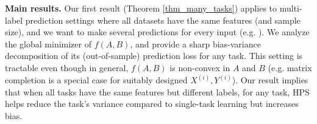 \medskip
\noindent\textbf{Main results.}
Our first result (Theorem \ref{thm_many_tasks}) applies to multi-label prediction settings where all datasets have the same features (and sample size), and we want to make several predictions for every input (e.g. \citet{hsu2009multi}).
We analyze the global minimizer of $f(A, B)$, and provide a sharp bias-variance decomposition of its (out-of-sample) prediction loss for any task.
This setting is tractable even though in general, $f(A, B)$ is non-convex in $A$ and $B$ (e.g. matrix completion is a special case for suitably designed $X^{(i)}, Y^{(i)}$).
Our result implies that when all tasks have the same features but different labels, for any task, HPS helps reduce the task's variance compared to single-task learning but increases bias.

